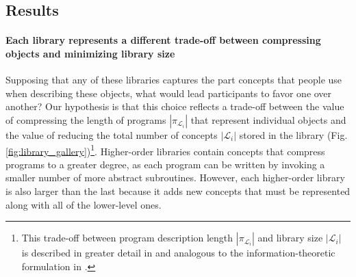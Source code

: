 \subsection{Results}
\paragraph{Each library represents a different trade-off between compressing objects and minimizing library size} 
Supposing that any of these libraries captures the part concepts that people use when describing these objects, what would lead participants to favor one over another? Our hypothesis is that this choice reflects a trade-off between the value of compressing the length of programs $|\pi_{\mathcal{L}_i}|$ that represent individual objects and the value of reducing the total number of concepts $|\mathcal{L}_i|$ stored in the library (Fig. \ref{fig:library_gallery})\footnote{This trade-off between program description length $|\pi_{\mathcal{L}_i}|$ and library size $|\mathcal{L}_i|$ is described in greater detail in  and analogous to the information-theoretic formulation in .}.
Higher-order libraries contain concepts that compress programs to a greater degree, as each program can be written by invoking a smaller number of more abstract subroutines.
However, each higher-order library is also larger than the last because it adds new concepts that must be represented along with all of the lower-level ones.




